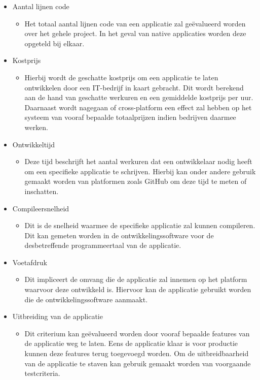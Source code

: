 \begin{itemize}
    \item Aantal lijnen code
    \begin{itemize}
        \item Het totaal aantal lijnen code van een applicatie zal geëvalueerd worden over het gehele project. In het geval van native applicaties worden deze opgeteld bij elkaar.
    \end{itemize}
    \item Kostprijs
    \begin{itemize}
        \item Hierbij wordt de geschatte kostprijs om een applicatie te laten ontwikkelen door een IT-bedrijf in kaart gebracht. Dit wordt berekend aan de hand van geschatte werkuren en een gemiddelde kostprijs per uur. Daarnaast wordt nagegaan of cross-platform een effect zal hebben op het systeem van vooraf bepaalde totaalprijzen indien bedrijven daarmee werken.
    \end{itemize}
    \item Ontwikkeltijd
    \begin{itemize}
        \item Deze tijd beschrijft het aantal werkuren dat een ontwikkelaar nodig heeft om een specifieke applicatie te schrijven. Hierbij kan onder andere gebruik gemaakt worden van platformen zoals GitHub om deze tijd te meten of inschatten.
    \end{itemize}
    \item Compileersnelheid
    \begin{itemize}
        \item Dit is de snelheid waarmee de specifieke applicatie zal kunnen compileren. Dit kan gemeten worden in de ontwikkelingssoftware voor de desbetreffende programmeertaal van de applicatie.
    \end{itemize}
    \item Voetafdruk
    \begin{itemize}
        \item Dit impliceert de omvang die de applicatie zal innemen op het platform waarvoor deze ontwikkeld is. Hiervoor kan de applicatie gebruikt worden die de ontwikkelingssoftware aanmaakt.
    \end{itemize}
    \item Uitbreiding van de applicatie
    \begin{itemize}
        \item Dit criterium kan geëvalueerd worden door vooraf bepaalde features van de applicatie weg te laten. Eens de applicatie klaar is voor productie kunnen deze features terug toegevoegd worden. Om de uitbreidbaarheid van de applicatie te staven kan gebruik gemaakt worden van voorgaande testcriteria.
    \end{itemize}
\end{itemize}